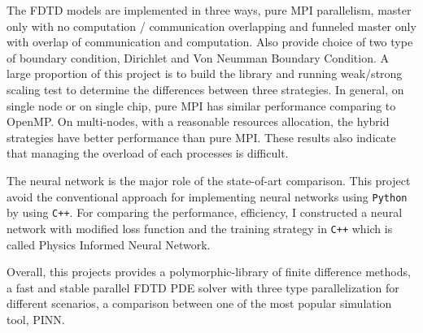 The FDTD models are implemented in three ways, pure MPI parallelism, master only with no computation / communication overlapping 
and funneled master only with overlap of communication and computation. 
Also provide choice of two type of boundary condition, Dirichlet and Von Neumman Boundary Condition.
A large proportion of this project is to build the library and running weak/strong scaling test to determine the differences between
three strategies.
In general, on single node or on single chip, pure MPI has similar performance comparing to OpenMP.
On multi-nodes, with a reasonable resources allocation, the hybrid strategies have better performance than pure MPI.
These results also indicate that managing the overload of each processes is difficult.

The neural network is the major role of the state-of-art comparison.
This project avoid the conventional approach for implementing neural networks using \texttt{Python} by using \texttt{C++}.
For comparing the performance, efficiency, I constructed 
a neural network with modified loss function and the training strategy in \texttt{C++} which is called Physics Informed Neural Network.

Overall, this projects provides a polymorphic-library of finite difference methods, 
a fast and stable parallel FDTD PDE solver with three type parallelization for different scenarios, 
a comparison between one of the most popular simulation tool, PINN.



